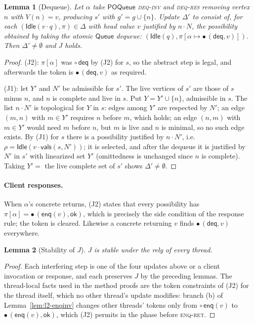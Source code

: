 \documentclass[11pt]{article}
\newtheorem{lemma}{Lemma}[section]
\theoremstyle{definition}
\theoremstyle{remark}
\newcommand{\Idle}{\mathsf{Idle}}
\newcommand{\Enq}{\mathsf{enq}}
\newcommand{\Deq}{\mathsf{deq}}
\newcommand{\ok}{\mathsf{ok}}
\newcommand{\vals}{\mathsf{vals}}
\newcommand{\poss}{\Delta}
\newcommand{\abst}{\rho}
\newcommand{\tokens}{\pi}
\newcommand{\code}[1]{\texttt{\detokenize{#1}}}
\newcommand{\POQueue}{\mathsf{POQueue}}
\newcommand{\Queue}{\mathsf{Queue}}
\newcommand{\tok}[1]{\circ\,#1}
\newcommand{\done}[2]{\bullet\,(#1,#2)}
\begin{document}
\begin{lemma}[Dequeue]\label{lem:l2-deq}
Let $\alpha$ take $\POQueue$ \textsc{deq-inv} and \textsc{deq-res} removing
vertex $n$ with $V(n) = v$, producing $s'$ with $g' = g \cup \{n\}$.  Update
$\poss'$ to consist of, for each $(\Idle(v \cdot q), \tokens) \in \poss$ with
head value $v$ justified by $n \cdot N$, the possibility obtained by taking
the atomic $\Queue$ dequeue: $(\Idle(q), \tokens[\alpha \mapsto
\done{\Deq}{v}])$.  Then $\poss' \ne \emptyset$ and $J$ holds.
\end{lemma}

\begin{proof}
(J2): $\tokens[\alpha]$ was $\tok{\Deq}$ by (J2) for $s$, so the abstract
step is legal, and afterwards the token is $\done{\Deq}{v}$ as required.

(J1): let $Y'$ and $N'$ be admissible for $s'$.  The live vertices of $s'$
are those of $s$ minus $n$, and $n$ is complete and live in $s$.  Put $Y = Y'
\cup \{n\}$, admissible in $s$.  The list $n \cdot N'$ is topological for
$Y$ in $s$: edges among $Y'$ are respected by $N'$; an edge $(m, n)$ with $m
\in Y'$ requires $n$ before $m$, which holds; an edge $(n, m)$ with $m \in
Y'$ would need $m$ before $n$, but $m$ is live and $n$ is minimal, so no
such edge exists.  By (J1) for $s$ there is a possibility justified by $n
\cdot N'$, i.e.\ $\abst = \Idle(v \cdot \vals(s, N'))$; it is selected, and
after the dequeue it is justified by $N'$ in $s'$ with linearized set $Y'$
(omittedness is unchanged since $n$ is complete).  Taking $Y' = $ the live
complete set of $s'$ shows $\poss' \ne \emptyset$.
\end{proof}

\paragraph{Client responses.}
When $\alpha$'s concrete \code{enq} returns, (J2) states that every
possibility has $\tokens[\alpha] = \done{\Enq(v)}{\ok}$, which is precisely
the side condition of the response rule; the token is cleared.  Likewise a
concrete \code{deq} returning $v$ finds $\done{\Deq}{v}$ everywhere.

\begin{lemma}[Stability of $J$]
$J$ is stable under the rely of every thread.
\end{lemma}

\begin{proof}
Each interfering step is one of the four updates above or a client
invocation or response, and each preserves $J$ by the preceding lemmas.
The thread-local facts used in the method proofs are the token constraints
of (J2) for the thread itself, which no other thread's update modifies:
branch (b) of Lemma~\ref{lem:l2-enqinv} changes other threads' tokens only
from $\tok{\Enq(v)}$ to $\done{\Enq(v)}{\ok}$, which (J2) permits in the
phase before \textsc{enq-ret}.
\end{proof}
\end{document}
